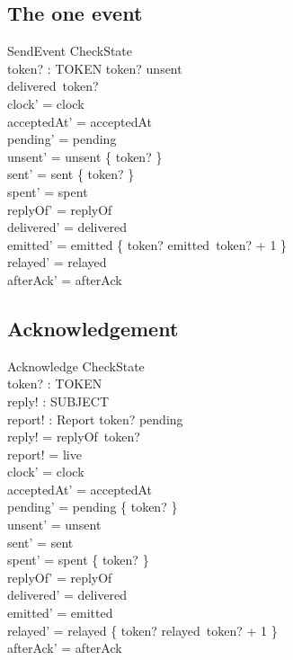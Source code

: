 \documentclass[a4paper,10pt,fleqn]{article}
\begin{document}
\subsection{The one event}

\begin{schema}{SendEvent}
  \Delta CheckState \\
  token? : TOKEN
\where
  token? \in unsent \\
  delivered~token?  \\
  clock' = clock \\
  acceptedAt' = acceptedAt \\
  pending' = pending \\
  unsent' = unsent \setminus \{ token? \} \\
  sent' = sent \cup \{ token? \} \\
  spent' = spent \\
  replyOf' = replyOf \\
  delivered' = delivered \\
  emitted' = emitted \oplus \{ token? \mapsto emitted~token? + 1 \} \\
  relayed' = relayed \\
  afterAck' = afterAck
\end{schema}

\subsection{Acknowledgement}

\begin{schema}{Acknowledge}
  \Delta CheckState \\
  token? : TOKEN \\
  reply! : SUBJECT \\
  report! : Report
\where
  token? \in pending \\
  reply! = replyOf~token? \\
  report! = live \\
  clock' = clock \\
  acceptedAt' = acceptedAt \\
  pending' = pending \setminus \{ token? \} \\
  unsent' = unsent \\
  sent' = sent \\
  spent' = spent \cup \{ token? \} \\
  replyOf' = replyOf \\
  delivered' = delivered \\
  emitted' = emitted \\
  relayed' = relayed \oplus \{ token? \mapsto relayed~token? + 1 \} \\
  afterAck' = afterAck
\end{schema}
\end{document}
